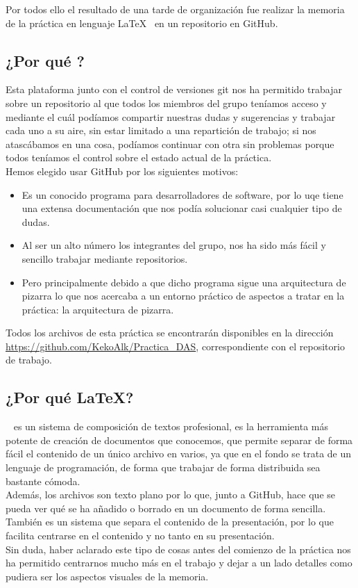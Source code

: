 Por todos ello el resultado de una tarde de organización fue realizar la memoria de la práctica en lenguaje \LaTeX~ en un repositorio en GitHub\cite{repositorio}.

\subsection*{¿Por qué ?}
Esta plataforma junto con el control de versiones git\cite{git} nos ha permitido trabajar sobre un repositorio al que todos los miembros del grupo teníamos acceso y mediante el cuál podíamos compartir nuestras dudas y sugerencias y trabajar cada uno a su aire, sin estar limitado a una repartición de trabajo; si nos atascábamos en una cosa, podíamos continuar con otra sin problemas porque todos teníamos el control sobre el estado actual de la práctica.\\

Hemos elegido usar GitHub por los siguientes motivos:
\begin{itemize}
	\item Es un conocido programa para desarrolladores de software, por lo uqe tiene una extensa documentación que nos podía solucionar casi cualquier tipo de dudas.
	\item Al ser un alto número los integrantes del grupo, nos ha sido más fácil y sencillo trabajar mediante repositorios. 
	\item Pero principalmente debido a que dicho programa sigue una arquitectura de pizarra lo que nos acercaba a un entorno práctico de aspectos a tratar en la práctica: la arquitectura de pizarra.
\end{itemize}

Todos los archivos de esta práctica se encontrarán disponibles en la dirección
\url{https://github.com/KekoAlk/Practica_DAS}, correspondiente con el repositorio de trabajo.

\subsection*{¿Por qué \LaTeX?}
~ es un sistema de composición de textos profesional, es la herramienta más potente de creación de documentos que conocemos, que permite separar de forma fácil el contenido de un único archivo en varios, ya que en el fondo se trata de un lenguaje de programación, de forma que trabajar de forma distribuida sea bastante cómoda.\\

Además, los archivos son texto plano por lo que, junto a GitHub, hace que se pueda ver qué se ha añadido o borrado en un documento de forma sencilla. También es un sistema que separa el contenido de la presentación, por lo que facilita centrarse en el contenido y no tanto en su presentación.\\

Sin duda, haber aclarado este tipo de cosas antes del comienzo de la práctica nos ha permitido centrarnos mucho más en el trabajo y dejar a un lado detalles como pudiera ser los aspectos visuales de la memoria.




